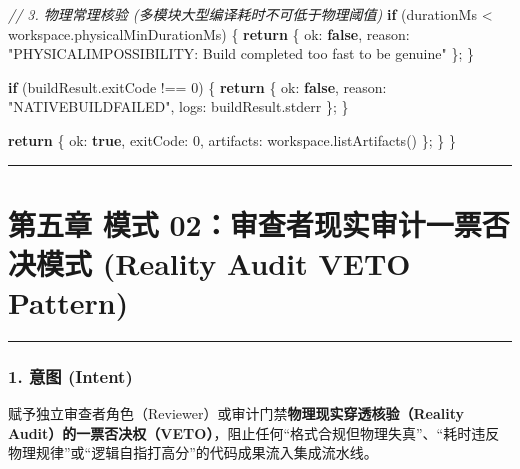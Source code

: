 \documentclass[
]{ctexart}
\newenvironment{Shaded}{}{}
\newcommand{\AttributeTok}[1]{\textcolor[rgb]{0.49,0.56,0.16}{#1}}
\newcommand{\CommentTok}[1]{\textcolor[rgb]{0.38,0.63,0.69}{\textit{#1}}}
\newcommand{\ControlFlowTok}[1]{\textcolor[rgb]{0.00,0.44,0.13}{\textbf{#1}}}
\newcommand{\DecValTok}[1]{\textcolor[rgb]{0.25,0.63,0.44}{#1}}
\newcommand{\FunctionTok}[1]{\textcolor[rgb]{0.02,0.16,0.49}{#1}}
\newcommand{\KeywordTok}[1]{\textcolor[rgb]{0.00,0.44,0.13}{\textbf{#1}}}
\newcommand{\NormalTok}[1]{#1}
\newcommand{\OperatorTok}[1]{\textcolor[rgb]{0.40,0.40,0.40}{#1}}
\newcommand{\StringTok}[1]{\textcolor[rgb]{0.25,0.44,0.63}{#1}}
\renewcommand{\_}{\discretionary{}{}{\textunderscore}}
\let\oldsection\section
\renewcommand{\section}{\clearpage\oldsection}
\begin{document}
\begin{Shaded}
\begin{Highlighting}[]
    \CommentTok{// 3. 物理常理核验 (多模块大型编译耗时不可低于物理阈值)}
    \ControlFlowTok{if}\NormalTok{ (durationMs }\OperatorTok{\textless{}}\NormalTok{ workspace}\OperatorTok{.}\AttributeTok{physicalMinDurationMs}\NormalTok{) \{}
      \ControlFlowTok{return}\NormalTok{ \{ ok}\OperatorTok{:} \KeywordTok{false}\OperatorTok{,}\NormalTok{ reason}\OperatorTok{:} \StringTok{"PHYSICAL\_IMPOSSIBILITY: Build completed too fast to be genuine"}\NormalTok{ \}}\OperatorTok{;}
\NormalTok{    \}}

    \ControlFlowTok{if}\NormalTok{ (buildResult}\OperatorTok{.}\AttributeTok{exitCode} \OperatorTok{!==} \DecValTok{0}\NormalTok{) \{}
      \ControlFlowTok{return}\NormalTok{ \{ ok}\OperatorTok{:} \KeywordTok{false}\OperatorTok{,}\NormalTok{ reason}\OperatorTok{:} \StringTok{"NATIVE\_BUILD\_FAILED"}\OperatorTok{,}\NormalTok{ logs}\OperatorTok{:}\NormalTok{ buildResult}\OperatorTok{.}\AttributeTok{stderr}\NormalTok{ \}}\OperatorTok{;}
\NormalTok{    \}}

    \ControlFlowTok{return}\NormalTok{ \{ ok}\OperatorTok{:} \KeywordTok{true}\OperatorTok{,}\NormalTok{ exitCode}\OperatorTok{:} \DecValTok{0}\OperatorTok{,}\NormalTok{ artifacts}\OperatorTok{:}\NormalTok{ workspace}\OperatorTok{.}\FunctionTok{listArtifacts}\NormalTok{() \}}\OperatorTok{;}
\NormalTok{  \}}
\NormalTok{\}}
\end{Highlighting}
\end{Shaded}

\begin{center}\rule{0.5\linewidth}{0.5pt}\end{center}

\section{第五章 模式 02：审查者现实审计一票否决模式 (Reality Audit VETO
Pattern)}\label{ux6a21ux5f0f-02ux5ba1ux67e5ux8005ux73b0ux5b9eux5ba1ux8ba1ux4e00ux7968ux5426ux51b3ux6a21ux5f0f-reality-audit-veto-pattern}

\begin{center}\rule{0.5\linewidth}{0.5pt}\end{center}

\subsubsection{1. 意图 (Intent)}\label{ux610fux56fe-intent-1}

赋予独立审查者角色（Reviewer）或审计门禁\textbf{物理现实穿透核验（Reality
Audit）的一票否决权（VETO）}，阻止任何``格式合规但物理失真''、``耗时违反物理规律''或``逻辑自指打高分''的代码成果流入集成流水线。
\end{document}
